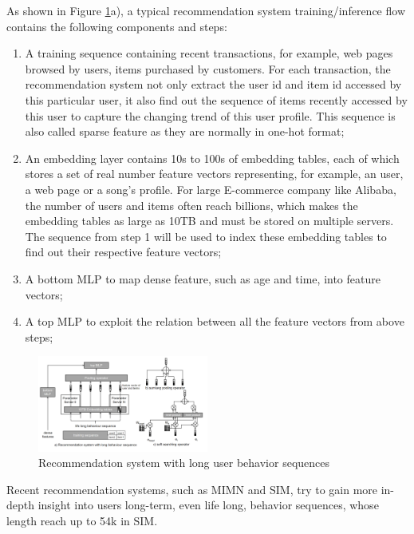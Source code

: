\documentclass[conference]{IEEEtran}
\begin{document}
As shown in Figure \ref{recsysLong}a),
a typical recommendation system training/inference flow contains the following components and steps:
\begin{enumerate}
\item A training sequence containing recent transactions,
for example,
web pages browsed by users,
items purchased by customers.
For each transaction,
the recommendation system not only extract the user id and item id accessed by this particular user, 
it also find out the sequence of items recently accessed by this user to capture the changing trend of this user profile.
This sequence is also called sparse feature as they are normally in one-hot format;
\item An embedding layer contains 10s to 100s of embedding tables,
each of which stores a set of real number feature vectors representing, 
for example,
an user, a web page or a song's profile.
For large E-commerce company like Alibaba,
the number of users and items often reach billions\cite{recsys_billionscale_alibaba},
which makes the embedding tables as large as 10TB and must be stored on multiple servers.
The sequence from step 1 will be used to index these embedding tables to find out their respective feature vectors;
\item A bottom MLP to map dense feature, 
such as age and time,
into feature vectors;
\item A top MLP to exploit the relation between all the feature vectors from above steps;
\end{enumerate}

\begin{figure}[tb]
\centering
\includegraphics[width=0.5\textwidth]  {recsysLong.png}
\caption{Recommendation system with long user behavior sequences}
\label{recsysLong}
\end{figure}

Recent recommendation systems,
such as MIMN\cite{recsys_mimn_alibaba} and SIM\cite{recsys_sim_alibaba},
try to gain more in-depth insight into users long-term, 
even life long, behavior sequences,
whose length reach up to 54k in SIM\cite{recsys_sim_alibaba}.
\end{document}
